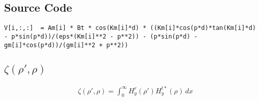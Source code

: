 \documentclass[11pt, oneside]{article}   	%
\begin{document}
\subsection{Source Code}

\begin{lstlisting}
V[i,:,:]  = Am[i] * Bt * cos(Km[i]*d) * ((Km[i]*cos(p*d)*tan(Km[i]*d) - p*sin(p*d))/(eps*(Km[i]**2 - p**2)) - (p*sin(p*d) - gm[i]*cos(p*d))/(gm[i]**2 + p**2))
\end{lstlisting}


\newpage


\subsection{$\zeta(\rho ', \rho)$}

\begin{align*}
&\zeta (\rho ',\rho) = \int_{0}^{\infty} H_{y}^{r} (\rho ') H_{y}^{t*} (\rho) \, dx
\end{align*}
\end{document}
